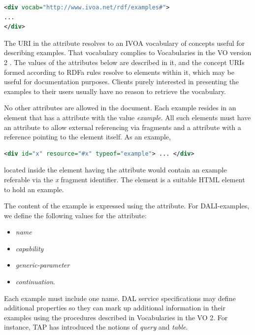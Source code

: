 \documentclass[11pt,letter]{ivoa}
\begin{document}
\begin{lstlisting}[language=XML]
<div vocab="http://www.ivoa.net/rdf/examples#">
...
</div>
\end{lstlisting}

The URI in the  attribute resolves to an IVOA vocabulary of
concepts useful for describing examples.  That vocabulary complies to
Vocabularies in the VO version 2 \citep{2021ivoa.spec.0525D}.   The
values of the  attributes below are described in it, and
the concept URIs formed according to RDFa rules resolve to elements
within it, which may be useful for documentation purposes.  Clients
purely interested in presenting the examples to their users usually have
no reason to retrieve the vocabulary.

No other  attributes are allowed in the document. Each example resides in
an element that has a  attribute with the value
\emph{example}. All such elements
must have an  attribute to allow external referencing via fragments and a
 attribute with a reference pointing to the element itself. As an
example,

\begin{lstlisting}[language=XML]
<div id="x" resource="#x" typeof="example"> ... </div>
\end{lstlisting}

\noindent located inside the element having the  attribute would
contain an example referable via the \emph{x} fragment identifier. The
 element is
a suitable HTML element to hold an example.

The content of the example is expressed using the  attribute. For
DALI-examples, we define the following values for the  attribute:

\begin{itemize}
\item \emph{name}
\item \emph{capability}
\item \emph{generic-parameter}
\item \emph{continuation}.
\end{itemize}

Each example must include one
name.  DAL service specifications may define additional
properties so they can mark up additional information in their examples
using the procedures described in Vocabularies in the VO 2.  For
instance, TAP has introduced the notions of \emph{query} and \emph{table}.
\end{document}
